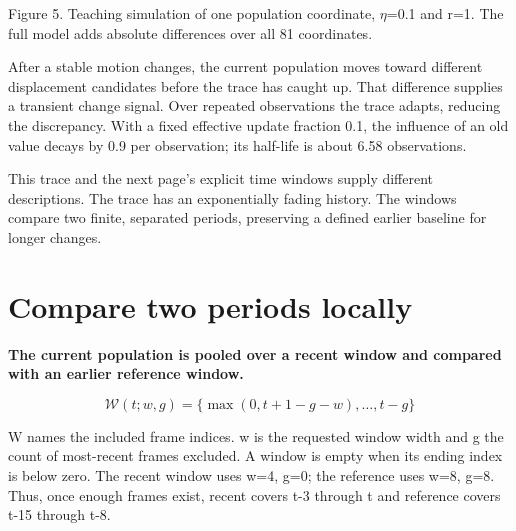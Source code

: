 \documentclass[11pt,letterpaper]{article}
\begin{document}
{
\small\color{muted} Figure 5. Teaching simulation of one population coordinate, \(\eta\)=0.1 and r=1. The full model adds absolute differences over all 81 coordinates.\par}


After a stable motion changes, the current population moves toward different displacement candidates before the trace has caught up. That difference supplies a transient change signal. Over repeated observations the trace adapts, reducing the discrepancy. With a fixed effective update fraction 0.1, the influence of an old value decays by 0.9 per observation; its half-life is about 6.58 observations.


This trace and the next page's explicit time windows supply different descriptions. The trace has an exponentially fading history. The windows compare two finite, separated periods, preserving a defined earlier baseline for longer changes.


\clearpage

\section{Compare two periods locally}\label{sec12}

\textbf{The current population is pooled over a recent window and compared with an earlier reference window.}


\begin{equation}\mathcal W(t;w,g)=\{\max(0,t+1-g-w),\ldots,t-g\}\end{equation}

W names the included frame indices. w is the requested window width and g the count of most-recent frames excluded. A window is empty when its ending index is below zero. The recent window uses w=4, g=0; the reference uses w=8, g=8. Thus, once enough frames exist, recent covers t-3 through t and reference covers t-15 through t-8.


\begin{center}\end{center}
\end{document}
